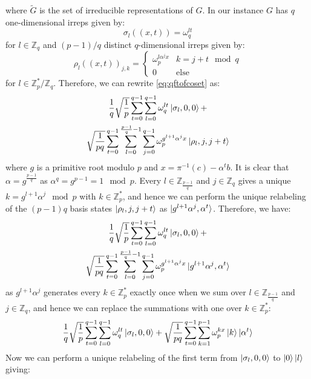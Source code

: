 \documentclass[aps,floatfix,10pt,amssymb,amsfont,amsmath,superscriptaddress,float,nofootinbib,longbibliography,nobalancelastpage,twocolumn]{revtex4-2}
\begin{document}
where $\tilde G$ is the set of irreducible representations of $G$. In our instance $G$ has $q$ one-dimensional irreps given by:
\begin{equation}
    \sigma_l((x,t)) = \omega^{lt}_q
\end{equation}
for $l \in \mathbb{Z}_q$ and $(p-1)/q$ distinct $q$-dimensional irreps given by:
\begin{equation}
    \rho_l((x,t))_{j,k} = \begin{cases}
        \omega_p^{l \alpha^j x} & k = j + t \mod q\\
        0 & \text{else}
    \end{cases}
\end{equation}
for $l \in \mathbb{Z}_p^*/\mathbb{Z}_q$. Therefore, we can rewrite \eqref{eq:qftofcoset} as:
\begin{multline}
     \frac{1}{q}\sqrt{\frac{1}{p}}\sum_{t=0}^{q-1}  \sum_{l=0}^{q-1}\omega^{lt}_q\ket{\sigma_l,0,0} +  \\\sqrt{\frac{1}{pq}}\sum_{t=0}^{q-1} \sum_{l =0}^{\frac{p-1}{q}-1}\sum_{j=0}^{q-1} \omega_p^{g^{l+1}\alpha^j x}\ket{\rho_l,j,j+t} 
\end{multline}
where $g$ is a primitive root modulo $p$ and $x = \pi^{-1}(c) - \alpha^tb$. It is clear that $\alpha = g^\frac{p-1}{q}$ as $\alpha^q = g^{p-1} = 1 \mod p$. Every $l  \in \mathbb{Z}_{\frac{p-1}{q}}$ and $j  \in \mathbb{Z}_q$ gives a unique $k=g^{l+1}\alpha^j \mod p$ with $k \in \mathbb{Z}_p^*$, and hence we can perform the unique relabeling of the $(p-1)q$ basis states $\ket{\rho_l,j,j+t}$ as $\ket{g^{l+1}\alpha^j,\alpha^t}$. Therefore, we have:
\begin{multline}
     \frac{1}{q}\sqrt{\frac{1}{p}}\sum_{t=0}^{q-1}  \sum_{l=0}^{q-1}\omega^{lt}_q\ket{\sigma_l,0,0} + \\ \sqrt{\frac{1}{pq}}\sum_{t=0}^{q-1} \sum_{l =0}^{\frac{p-1}{q}-1}\sum_{j=0}^{q-1} \omega_p^{g^{l+1} \alpha^j x}\ket{g^{l+1}\alpha^j,\alpha^t}
\end{multline}
as $g^{l+1} \alpha^j$ generates every $k \in \mathbb{Z}_p^*$ exactly once when we sum over $l \in \mathbb{Z}_{\frac{p-1}{q}}$ and $j \in \mathbb{Z}_q$, and hence we can replace the summations with one over $k \in \mathbb{Z}_p^*$:
\begin{equation}
     \frac{1}{q}\sqrt{\frac{1}{p}}\sum_{t=0}^{q-1}  \sum_{l=0}^{q-1}\omega^{lt}_q\ket{\sigma_l,0,0} +  \sqrt{\frac{1}{pq}}\sum_{t=0}^{q-1} \sum_{k=1}^{p-1} \omega_p^{k x}\ket{k}\ket{\alpha^t}
\end{equation}
Now we can perform a unique relabeling of the first term from $\ket{\sigma_l,0,0}$ to $\ket{0}\ket{l}$ giving:
\end{document}

